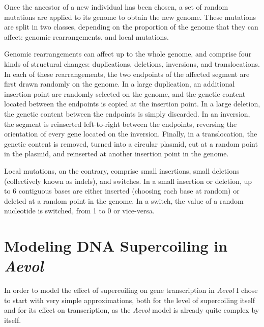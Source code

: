 Once the ancestor of a new individual has been chosen, a set of random mutations are applied to its genome to obtain the new genome.
These mutations are split in two classes, depending on the proportion of the genome that they can affect: genomic rearrangements, and local mutations.

Genomic rearrangements can affect up to the whole genome, and comprise four kinds of structural changes: duplications, deletions, inversions, and translocations.
In each of these rearrangements, the two endpoints of the affected segment are first drawn randomly on the genome.
In a large duplication, an additional insertion point are randomly selected on the genome, and the genetic content located between the endpoints is copied at the insertion point.
In a large deletion, the genetic content between the endpoints is simply discarded.
In an inversion, the segment is reinserted left-to-right between the endpoints, reversing the orientation of every gene located on the inversion.
Finally, in a translocation, the genetic content is removed, turned into a circular plasmid, cut at a random point in the plasmid, and reinserted at another insertion point in the genome.

Local mutations, on the contrary, comprise small insertions, small  deletions (collectively known as indels), and switches.
In a small insertion or deletion, up to 6 contiguous bases are either inserted (choosing each base at random) or deleted at a random point in the genome.
In a switch, the value of a random nucleotide is switched, from 1 to 0 or vice-versa.


\section{Modeling DNA Supercoiling in \emph{Aevol}}
\label{sec:aevol:aevol_sc}

In order to model the effect of supercoiling on gene transcription in \emph{Aevol} I chose to start with very simple approximations,
both for the level of supercoiling itself and for its effect on transcription, as the \emph{Aevol} model is already quite complex by itself.

